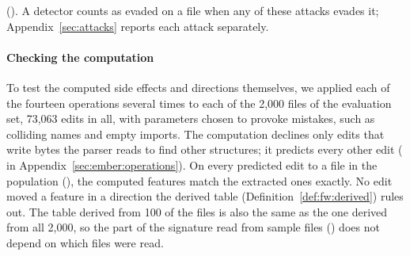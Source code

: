 (). A detector counts as evaded on a file when any of these attacks evades it;
Appendix~\ref{sec:attacks} reports each attack separately.

\paragraph{Checking the computation}
To test the computed side effects and directions themselves, we applied each of the fourteen operations several times to each of the 2,000 files of the evaluation set, 73,063
edits in all, with parameters chosen to provoke mistakes, such as colliding names and empty imports. The computation
declines only edits that write bytes the parser reads to find other structures; it predicts every other edit
( in Appendix~\ref{sec:ember:operations}). On every predicted edit to a file in the population
(), the computed features match the extracted ones exactly. No edit moved a feature in
a direction the derived table (Definition~\ref{def:fw:derived}) rules out. The table derived from 100 of the files is
also the same as the one derived from all 2,000, so the part of the signature read from sample files
() does not depend on which files were read.

